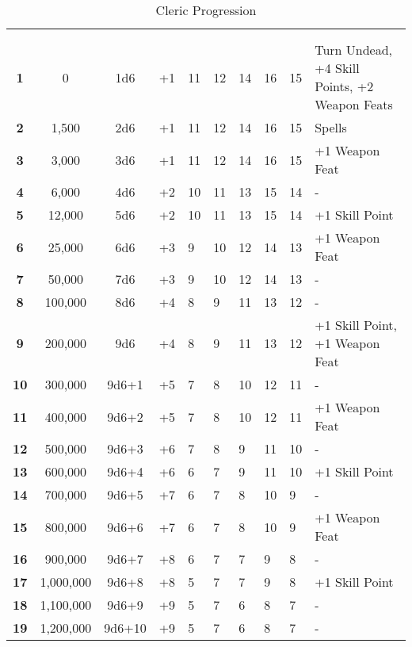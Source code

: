 \begin {table}[H]
  \caption{Cleric Progression}
	\begin{tabularx}{\columnwidth}{>{\bfseries}cccM{.31in}M{.51in}M{.25in}M{.43in}M{.32in}M{.45in}Y}
		\thead{}&\thead{}&\thead{}&\thead{}&\thead{}&\setcounter{rownum}{0}\\
		 &  &  &  &  &  &  &  &  & \\
		1 & 0 & 1d6 & +1 & 11 & 12 & 14 & 16 & 15 & Turn Undead, +4 Skill Points, +2 Weapon Feats\\
		2 & 1,500 & 2d6 & +1 & 11 & 12 & 14 & 16 & 15 & Spells\\
		3 & 3,000 & 3d6 & +1 & 11 & 12 & 14 & 16 & 15 & +1 Weapon Feat\\
		4 & 6,000 & 4d6 & +2 & 10 & 11 & 13 & 15 & 14 & -\\
		5 & 12,000 & 5d6 & +2 & 10 & 11 & 13 & 15 & 14 & +1 Skill Point\\
		6 & 25,000 & 6d6 & +3 & 9 & 10 & 12 & 14 & 13 & +1 Weapon Feat\\
		7 & 50,000 & 7d6 & +3 & 9 & 10 & 12 & 14 & 13 & -\\
		8 & 100,000 & 8d6 & +4 & 8 & 9 & 11 & 13 & 12 & -\\
		9 & 200,000 & 9d6 & +4 & 8 & 9 & 11 & 13 & 12 & +1 Skill Point, +1 Weapon Feat\\
		10 & 300,000 & 9d6+1 & +5 & 7 & 8 & 10 & 12 & 11 & -\\
		11 & 400,000 & 9d6+2 & +5 & 7 & 8 & 10 & 12 & 11 & +1 Weapon Feat\\
		12 & 500,000 & 9d6+3 & +6 & 7 & 8 & 9 & 11 & 10 & -\\
		13 & 600,000 & 9d6+4 & +6 & 6 & 7 & 9 & 11 & 10 & +1 Skill Point\\
		14 & 700,000 & 9d6+5 & +7 & 6 & 7 & 8 & 10 & 9 & -\\
		15 & 800,000 & 9d6+6 & +7 & 6 & 7 & 8 & 10 & 9 & +1 Weapon Feat\\
		16 & 900,000 & 9d6+7 & +8 & 6 & 7 & 7 & 9 & 8 & -\\
		17 & 1,000,000 & 9d6+8 & +8 & 5 & 7 & 7 & 9 & 8 & +1 Skill Point\\
		18 & 1,100,000 & 9d6+9 & +9 & 5 & 7 & 6 & 8 & 7 & -\\
		19 & 1,200,000 & 9d6+10 & +9 & 5 & 7 & 6 & 8 & 7 & -\\

\end{tabularx}
\end{table}
